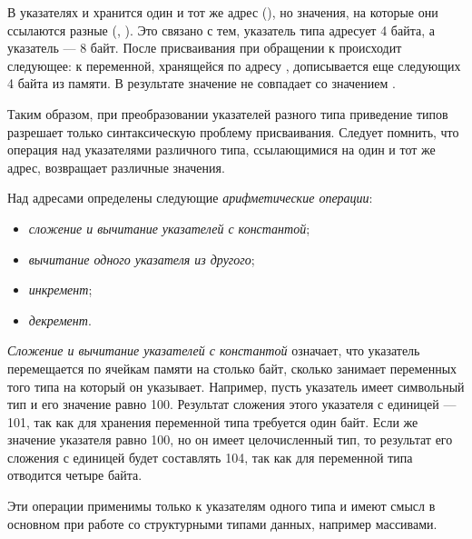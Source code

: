 

В указателях  и  хранится один и тот же адрес
(), но значения, на которые они ссылаются разные (,
). Это связано с тем, указатель типа  адресует 4 байта, а
указатель  --- 8 байт. После присваивания  при обращении к
 происходит следующее: к переменной, хранящейся по адресу , дописывается еще
следующих 4 байта из памяти. В результате значение  не совпадает со значением
.

Таким образом, при преобразовании указателей разного типа приведение типов разрешает только синтаксическую проблему
присваивания. Следует помнить, что операция \Sys{*} над указателями различного типа, ссылающимися на один
и тот же адрес, возвращает различные значения.

Над адресами  определены следующие
\emph{арифметические операции}:

\begin{itemize}
\item {}\emph{сложение и вычитание указателей с
константой};
\item {}\emph{вычитание одного указателя из другого};
\item {}\emph{инкремент};
\item {}\emph{декремент}.
\end{itemize}

\emph{Сложение и вычитание указателей с константой}  означает, что указатель
перемещается по ячейкам памяти на столько байт, сколько занимает  переменных того типа на который
он указывает. Например, пусть указатель имеет символьный тип и его значение равно 100. Результат сложения этого
указателя с единицей --- 101, так как для хранения переменной типа  требуется один байт. Если же
значение указателя равно 100, но он имеет целочисленный тип, то результат его сложения с единицей будет составлять 104,
так как для переменной типа  отводится четыре байта.

Эти операции применимы только к указателям одного типа и имеют смысл в основном при работе со структурными типами
данных, например массивами.

